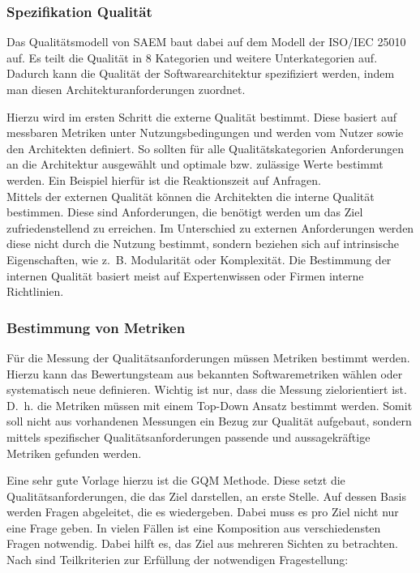 \subsubsection{Spezifikation Qualität}
Das Qualitätsmodell von \ac{SAEM} baut dabei auf dem Modell der ISO/IEC 25010 auf. Es teilt die Qualität in 8 Kategorien und weitere Unterkategorien auf\cite{ISOIEC25010}. Dadurch kann die Qualität der Softwarearchitektur spezifiziert werden, indem man diesen Architekturanforderungen zuordnet.


Hierzu wird im ersten Schritt die externe Qualität bestimmt. Diese basiert auf messbaren Metriken unter Nutzungsbedingungen und werden vom Nutzer sowie den Architekten definiert\cite{Duenas1998}. So sollten für alle Qualitätskategorien Anforderungen an die Architektur ausgewählt und optimale bzw. zulässige Werte bestimmt werden. Ein Beispiel hierfür ist die Reaktionszeit auf Anfragen.\\ 
Mittels der externen Qualität können die Architekten die interne Qualität bestimmen. Diese sind Anforderungen, die benötigt werden um das Ziel zufriedenstellend zu erreichen. Im Unterschied zu externen Anforderungen werden diese nicht durch die Nutzung bestimmt, sondern beziehen sich auf intrinsische Eigenschaften, wie z.~B. Modularität oder Komplexität\cite{Duenas1998}. Die Bestimmung der internen Qualität basiert meist auf Expertenwissen oder Firmen interne Richtlinien.

\subsubsection{Bestimmung von Metriken}
Für die Messung der Qualitätsanforderungen müssen Metriken bestimmt werden. Hierzu kann das Bewertungsteam aus bekannten Softwaremetriken wählen oder systematisch neue definieren. Wichtig ist nur, dass die Messung zielorientiert ist. D. h. die Metriken müssen mit einem Top-Down Ansatz bestimmt werden\cite{Habenicht2008}. Somit soll nicht aus vorhandenen Messungen ein Bezug zur Qualität aufgebaut, sondern mittels spezifischer Qualitätsanforderungen passende und aussagekräftige Metriken gefunden werden.

Eine sehr gute Vorlage hierzu ist die \ac{GQM} Methode. Diese setzt die Qualitätsanforderungen, die das Ziel darstellen, an erste Stelle. Auf dessen Basis werden Fragen abgeleitet, die es wiedergeben. Dabei muss es pro Ziel nicht nur eine Frage geben. In vielen Fällen ist eine Komposition aus verschiedensten Fragen notwendig. Dabei hilft es, das Ziel aus mehreren Sichten zu betrachten. Nach\cite{Habenicht2008}
sind Teilkriterien zur Erfüllung der notwendigen Fragestellung:
 
